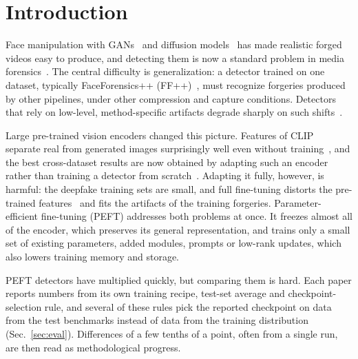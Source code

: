 \documentclass[fonts]{icst}
\begin{document}


\maketitle

\section{Introduction}

Face manipulation with GANs~\cite{goodfellow2020gan} and diffusion models~\cite{yang2022diffusion} has made realistic forged videos easy to produce, and detecting them is now a standard problem in media forensics~\cite{pei2024survey,liu2024evolving}. The central difficulty is generalization: a detector trained on one dataset, typically FaceForensics++ (FF++)~\cite{rossler2019ff}, must recognize forgeries produced by other pipelines, under other compression and capture conditions. Detectors that rely on low-level, method-specific artifacts degrade sharply on such shifts~\cite{qian2020frequency,luo2021srm,yan2023deepfakebench}.

Large pre-trained vision encoders changed this picture. Features of CLIP~\cite{radford2021clip_vitl} separate real from generated images surprisingly well even without training~\cite{ojha2023universal,tsai2024trainingfree}, and the best cross-dataset results are now obtained by adapting such an encoder rather than training a detector from scratch~\cite{yan2025effort,yermakov2025gend,cui2025forada}. Adapting it fully, however, is harmful: the deepfake training sets are small, and full fine-tuning distorts the pre-trained features~\cite{kumar2022finetuning} and fits the artifacts of the training forgeries. Parameter-efficient fine-tuning (PEFT) addresses both problems at once. It freezes almost all of the encoder, which preserves its general representation, and trains only a small set of existing parameters, added modules, prompts or low-rank updates, which also lowers training memory and storage.

PEFT detectors have multiplied quickly, but comparing them is hard. Each paper reports numbers from its own training recipe, test-set average and checkpoint-selection rule, and several of these rules pick the reported checkpoint on data from the test benchmarks instead of data from the training distribution (Sec.~\ref{sec:eval}). Differences of a few tenths of a point, often from a single run, are then read as methodological progress.
\end{document}
